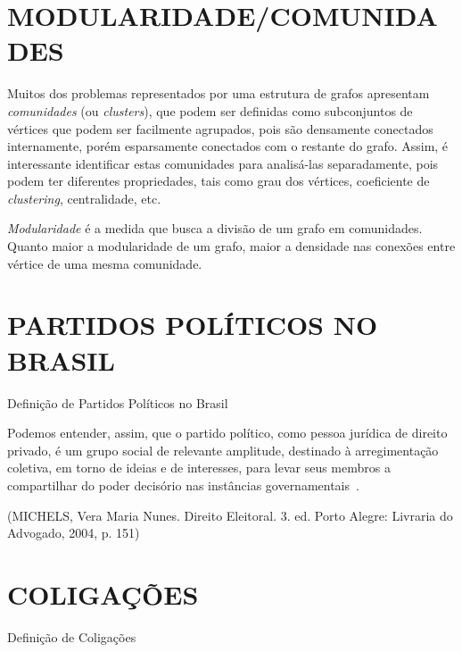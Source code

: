 \section{\texorpdfstring{\MakeUppercase{Modularidade/comunidades}}{}}
\label{conceitos__modularidade}

Muitos dos problemas representados por uma estrutura de grafos apresentam \emph{comunidades} (ou \emph{clusters}), que podem ser definidas como subconjuntos de vértices que podem ser facilmente agrupados, pois são densamente conectados internamente, porém esparsamente conectados com o restante do grafo. Assim, é interessante identificar estas comunidades para analisá-las separadamente, pois podem ter diferentes propriedades, tais como grau dos vértices, coeficiente de \emph{clustering}, centralidade, etc.

\emph{Modularidade} é a medida que busca a divisão de um grafo em comunidades. Quanto maior a modularidade de um grafo, maior a densidade nas conexões entre vértice de uma mesma comunidade.

\section{\texorpdfstring{\MakeUppercase{Partidos Políticos no Brasil}}{}}
\label{conceitos__partidos-brasil}

Definição de Partidos Políticos no Brasil

Podemos entender, assim, que o partido político, como pessoa jurídica de direito privado, é um grupo social de relevante amplitude, destinado à arregimentação coletiva, em torno de ideias e de interesses, para levar seus membros a compartilhar do poder decisório nas instâncias governamentais~\cite{michels2010direito}.

(MICHELS, Vera Maria Nunes. Direito Eleitoral. 3. ed. Porto Alegre: Livraria do Advogado, 2004, p. 151)



\section{\texorpdfstring{\MakeUppercase{Coligações}}{}}
\label{conceitos__coligacoes}

Definição de Coligações


